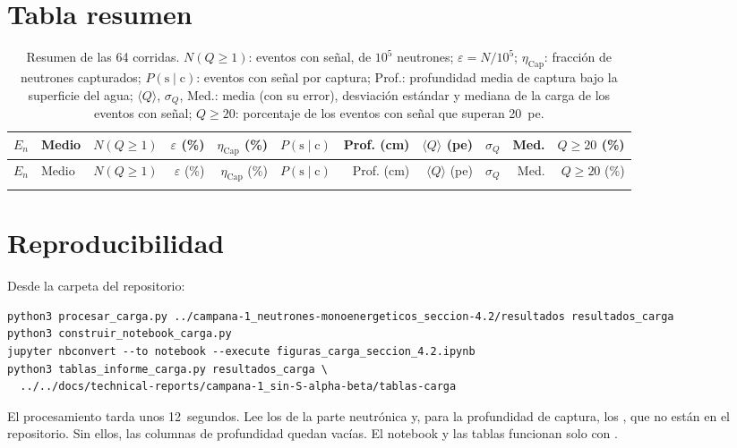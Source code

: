\documentclass[11pt,a4paper]{article}
\newcommand{\tablas}{tablas-carga}
\begin{document}
\section{Tabla resumen}
\label{sec:tabla}

{\scriptsize\setlength{\tabcolsep}{3.5pt}
\begin{longtable}{@{}llrrrrrrrrr@{}}
\caption{Resumen de las 64 corridas. $N(Q\geq1)$: eventos con señal, de $10^5$ neutrones; $\varepsilon=N/10^5$; $\eta_\mathrm{Cap}$: fracción de neutrones capturados; $P(\text{s}\mid\text{c})$: eventos con señal por captura; Prof.: profundidad media de captura bajo la superficie del agua; $\langle Q\rangle$, $\sigma_Q$, Med.: media (con su error), desviación estándar y mediana de la carga de los eventos con señal; $Q\geq20$: porcentaje de los eventos con señal que superan 20~pe.}
\label{tab:resumen}\\
\toprule
$E_n$ & Medio & $N(Q\geq1)$ & $\varepsilon$ (\%) & $\eta_\mathrm{Cap}$ (\%) & $P(\text{s}\mid\text{c})$ &
Prof. (cm) & $\langle Q\rangle$ (pe) & $\sigma_Q$ & Med. & $Q\geq20$ (\%) \\
\midrule
\endfirsthead
\toprule
$E_n$ & Medio & $N(Q\geq1)$ & $\varepsilon$ (\%) & $\eta_\mathrm{Cap}$ (\%) & $P(\text{s}\mid\text{c})$ &
Prof. (cm) & $\langle Q\rangle$ (pe) & $\sigma_Q$ & Med. & $Q\geq20$ (\%) \\
\midrule
\endhead
 \\
\bottomrule
\end{longtable}}

\section{Reproducibilidad}

Desde la carpeta  del repositorio:
\begin{lstlisting}
python3 procesar_carga.py ../campana-1_neutrones-monoenergeticos_seccion-4.2/resultados resultados_carga
python3 construir_notebook_carga.py
jupyter nbconvert --to notebook --execute figuras_carga_seccion_4.2.ipynb
python3 tablas_informe_carga.py resultados_carga \
  ../../docs/technical-reports/campana-1_sin-S-alpha-beta/tablas-carga
\end{lstlisting}
El procesamiento tarda unos 12~segundos. Lee los  de la parte neutrónica y, para la profundidad de captura, los , que no están en el repositorio. Sin ellos, las columnas de profundidad quedan vacías. El notebook y las tablas funcionan solo con .
\end{document}
